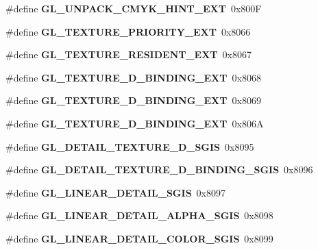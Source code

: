 \begin{DoxyCompactItemize}
\item 
\#define {\bfseries G\+L\+\_\+\+U\+N\+P\+A\+C\+K\+\_\+\+C\+M\+Y\+K\+\_\+\+H\+I\+N\+T\+\_\+\+E\+X\+T}~0x800\+F\label{_s_d_l__opengl_8h_a82a058f6c4681586d5de755618138047}

\item 
\#define {\bfseries G\+L\+\_\+\+T\+E\+X\+T\+U\+R\+E\+\_\+\+P\+R\+I\+O\+R\+I\+T\+Y\+\_\+\+E\+X\+T}~0x8066\label{_s_d_l__opengl_8h_aeaf823693e15ce70d2451103c9d985f9}

\item 
\#define {\bfseries G\+L\+\_\+\+T\+E\+X\+T\+U\+R\+E\+\_\+\+R\+E\+S\+I\+D\+E\+N\+T\+\_\+\+E\+X\+T}~0x8067\label{_s_d_l__opengl_8h_a9db08a400e9b3173a43ad05cef09ea11}

\item 
\#define {\bfseries G\+L\+\_\+\+T\+E\+X\+T\+U\+R\+E\+\_\+D\+\_\+\+B\+I\+N\+D\+I\+N\+G\+\_\+\+E\+X\+T}~0x8068\label{_s_d_l__opengl_8h_ab8c6077ddd57e913fb87a8f65aaea198}

\item 
\#define {\bfseries G\+L\+\_\+\+T\+E\+X\+T\+U\+R\+E\+\_\+D\+\_\+\+B\+I\+N\+D\+I\+N\+G\+\_\+\+E\+X\+T}~0x8069\label{_s_d_l__opengl_8h_aee0c8b993963c6bc540106c2322cc855}

\item 
\#define {\bfseries G\+L\+\_\+\+T\+E\+X\+T\+U\+R\+E\+\_\+D\+\_\+\+B\+I\+N\+D\+I\+N\+G\+\_\+\+E\+X\+T}~0x806\+A\label{_s_d_l__opengl_8h_afa4425bccef49dcb22972da33d0464cf}

\item 
\#define {\bfseries G\+L\+\_\+\+D\+E\+T\+A\+I\+L\+\_\+\+T\+E\+X\+T\+U\+R\+E\+\_\+D\+\_\+\+S\+G\+I\+S}~0x8095\label{_s_d_l__opengl_8h_ae859b11489157f82c82a772440caa653}

\item 
\#define {\bfseries G\+L\+\_\+\+D\+E\+T\+A\+I\+L\+\_\+\+T\+E\+X\+T\+U\+R\+E\+\_\+D\+\_\+\+B\+I\+N\+D\+I\+N\+G\+\_\+\+S\+G\+I\+S}~0x8096\label{_s_d_l__opengl_8h_a2fe42d2ca06d900253e7a94b77707b38}

\item 
\#define {\bfseries G\+L\+\_\+\+L\+I\+N\+E\+A\+R\+\_\+\+D\+E\+T\+A\+I\+L\+\_\+\+S\+G\+I\+S}~0x8097\label{_s_d_l__opengl_8h_a91e936592eef5bb73a05f0e9639a7ef2}

\item 
\#define {\bfseries G\+L\+\_\+\+L\+I\+N\+E\+A\+R\+\_\+\+D\+E\+T\+A\+I\+L\+\_\+\+A\+L\+P\+H\+A\+\_\+\+S\+G\+I\+S}~0x8098\label{_s_d_l__opengl_8h_a63907e9da6b787f8100990a6b6d10739}

\item 
\#define {\bfseries G\+L\+\_\+\+L\+I\+N\+E\+A\+R\+\_\+\+D\+E\+T\+A\+I\+L\+\_\+\+C\+O\+L\+O\+R\+\_\+\+S\+G\+I\+S}~0x8099\label{_s_d_l__opengl_8h_a8e92b3432f9b7fb79c1eaa531fe8dcc0}


\end{DoxyCompactItemize}
